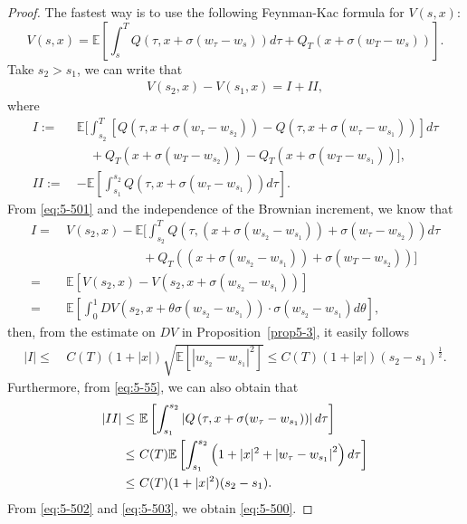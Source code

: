 \documentclass[11pt]{article}
\numberwithin{equation}{section}
\newcommand{\e}{\mathbb{E}}
\newcommand{\1}{\mbox{1\hspace{-1mm}I}}
\begin{document}
\begin{proof}
The fastest way is to use the following Feynman-Kac formula for $V(s,x)$:
\begin{equation}\label{eq:5-501}
    V(s,x)=\e\left[\int_{s}^{T}Q\left(\tau,x+\sigma(w_\tau-w_s)\right)d\tau+Q_{T}\left(x+\sigma(w_T-w_s)\right)\right].
\end{equation}
Take $s_{2}>s_{1}$, we can write that
\begin{align*}
    V(s_{2},x)-V(s_{1},x)=I+II, 
\end{align*}
where
\begin{align*}
    I:=\ & \e \bigg[\int_{s_{2}}^{T}\left[Q\left(\tau,x+\sigma(w_\tau-w_{s_{2}})\right)-Q\left(\tau,x+\sigma(w_\tau-w_{s_{1}})\right)\right]d\tau\\
    &\quad + Q_{T}\left(x+\sigma(w_T-w_{s_{2}})\right)-Q_{T}\left(x+\sigma(w_T-w_{s_{1}})\right)\bigg],\\
    II:=\ & -\e \left[\int_{s_{1}}^{s_{2}}Q\left(\tau,x+\sigma(w_\tau-w_{s_{1}})\right)d\tau\right].
\end{align*}
From \eqref{eq:5-501} and the independence of the Brownian increment, we know that
\begin{align*}
    I=\ & V(s_{2},x)- \e \bigg[\int_{s_{2}}^{T} Q\left(\tau,\left(x+\sigma(w_{s_2}-w_{s_{1}})\right)+\sigma(w_\tau-w_{s_{2}})\right) d\tau  \\
    &\qquad\qquad\qquad + Q_{T}\left(\left(x+\sigma(w_{s_2}-w_{s_{1}})\right)+\sigma(w_T-w_{s_{2}})\right)\bigg]\\
    =\ & \e\left[V(s_{2},x)-V\left(s_2, x+\sigma(w_{s_{2}}-w_{s_{1}})\right) \right]\\
    =\ & \e\left[\int_0^1 DV(s_2, x+\theta\sigma (w_{s_{2}}-w_{s_{1}}))\cdot \sigma (w_{s_{2}}-w_{s_{1}})d\theta\right],
\end{align*}
then, from the estimate on $DV$ in Proposition~\ref{prop5-3}, it easily follows 
\begin{align}
    |I|\le\ & C(T)(1+|x|) \sqrt{\e\left[ \left|w_{s_{2}}-w_{s_{1}}\right|^2\right]} \le C(T)(1+|x|)(s_{2}-s_{1})^{\frac{1}{2}}.\label{eq:5-502}
\end{align}
Furthermore, from \eqref{eq:5-55}, we can also obtain that
\begin{align}
    |II|\le\ &  \e\left[\int_{s_{1}}^{s_{2}}\left|Q\left(\tau,x+\sigma(w_\tau-w_{s_{1}})\right)\right|d\tau\right] \notag \\
    \le\ & C(T) \e\left[\int_{s_{1}}^{s_{2}}\left(1+|x|^2+\left|w_\tau-w_{s_{1}}\right|^2\right)d\tau\right] \notag \\
    \le\ &  C(T)(1+|x|^{2})(s_{2}-s_{1}).\label{eq:5-503}
\end{align}
From \eqref{eq:5-502} and \eqref{eq:5-503}, we obtain \eqref{eq:5-500}.
\end{proof}
\end{document}
